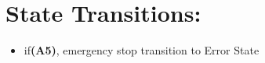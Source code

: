 \documentclass[12pt]{article}
\begin{document}
\section{State Transitions:}

\begin{itemize}
  \item if\textbf{(A5)}, emergency stop transition to Error State
\end{itemize} 
 

 
\end{document}
